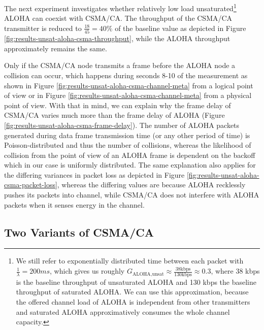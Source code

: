 The next experiment investigates whether relatively low load unsaturated\footnote{We still refer to exponentially distributed time between each packet with $\frac{1}{\lambda}=200ms$, which gives us roughly $G_\text{ALOHA,unsat} \approx \frac{38 \text{kbps}}{130 \text{kbps}}\approx 0.3$, where 38 kbps is the baseline throughput of unsaturated ALOHA and 130 kbps the baseline throughput of saturated ALOHA. We can use this approximation, because the offered channel load of ALOHA is independent from other transmitters and saturated ALOHA approximatively consumes the whole channel capacity.} ALOHA can coexist with CSMA/CA. The throughput of the CSMA/CA transmitter is reduced to $\frac{18}{45}=40\%$ of the baseline value as depicted in Figure \ref{fig:results-unsat-aloha-csma-throughput}, while the ALOHA throughput approximately remains the same.

Only if the CSMA/CA node transmits a frame before the ALOHA node a collision can occur, which happens during seconds 8-10 of the measurement as shown in Figure \ref{fig:results-unsat-aloha-csma-channel-meta} from a logical point of view or in Figure \ref{fig:results-unsat-aloha-csma-channel-meta} from a physical point of view. With that in mind, we can explain why the frame delay of CSMA/CA varies much more than the frame delay of ALOHA (Figure  \ref{fig:results-unsat-aloha-csma-frame-delay}). The number of ALOHA packets generated during data frame transmission time (or any other period of time) is Poisson-distributed and thus the number of collisions, whereas the likelihood of collision from the point of view of an ALOHA frame is dependent on the backoff which in our case is uniformly distributed. The same explanation also applies for the differing variances in packet loss as depicted in Figure \ref{fig:results-unsat-aloha-csma-packet-loss}, whereas the differing values are because ALOHA recklessly pushes its packets into channel, while CSMA/CA does not interfere with ALOHA packets when it senses energy in the channel.

\clearpage

\subsection{Two Variants of CSMA/CA}

